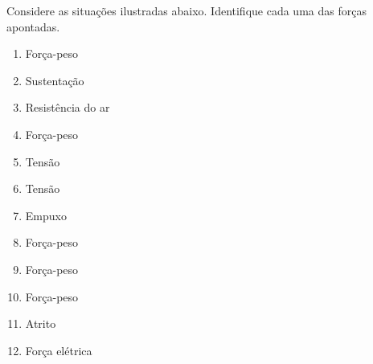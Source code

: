\begin{question}
    Considere as situações ilustradas abaixo.
    Identifique cada uma das forças apontadas.


    \begin{minipage}{0.3\textwidth}
    \end{minipage}\hfill
    \begin{minipage}{0.3\textwidth}
    \end{minipage}\hfill
    \begin{minipage}{0.3\textwidth}
    \end{minipage}

    \begin{minipage}{0.3\textwidth}
    \end{minipage}\hfill
    \begin{minipage}{0.3\textwidth}
    \end{minipage}\hfill
    \begin{minipage}{0.3\textwidth}
    \end{minipage}

    \begin{answer}
      \begin{enumerate}
        \item Força-peso
        \item Sustentação
        \item Resistência do ar
        \item Força-peso
        \item Tensão
        \item Tensão
        \item Empuxo
        \item Força-peso
        \item Força-peso
        \item Força-peso
        \item Atrito
        \item Força elétrica
      \end{enumerate}
    \end{answer}
  \end{question}